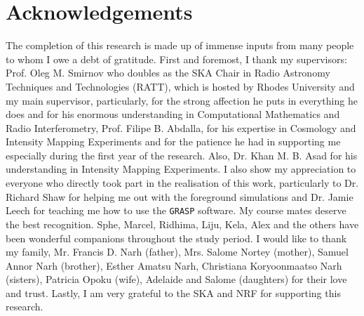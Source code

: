 \chapter*{Acknowledgements}
 \vspace*{-2em}
 The completion of this research is made up of immense inputs from many people to whom I owe a debt of gratitude. 
First and foremost, I thank my supervisors: Prof. Oleg M. Smirnov who doubles as the 
SKA Chair in Radio Astronomy Techniques and Technologies (RATT), which is hosted by Rhodes University 
and my main supervisor, particularly, for the strong affection he puts in everything he does and for his enormous understanding 
in Computational Mathematics and Radio Interferometry, Prof. Filipe B. Abdalla, for his expertise in Cosmology and Intensity Mapping Experiments and for the
patience he had in supporting me especially during the first year of the research. Also, Dr. Khan M. B. Asad for his understanding in Intensity Mapping Experiments.
I also show my appreciation to everyone who directly took part in the realisation of this work, particularly 
to Dr. Richard Shaw for helping me out with the foreground simulations and Dr. Jamie Leech for teaching me how to use the {\tt GRASP} software.
My course mates deserve the best recognition. Sphe, Marcel, Ridhima, Liju, Kela, Alex and the others 
have been wonderful companions throughout the study period. I would like to thank my family, Mr. Francis D. Narh (father),
Mrs. Salome Nortey (mother), Samuel Annor Narh (brother), Esther Amatsu Narh, Christiana Koryoonmaatso Narh (sisters), Patricia Opoku (wife), Adelaide and Salome (daughters) 
for their love and trust. Lastly, I am very grateful to the SKA and NRF for supporting this research.
% 
